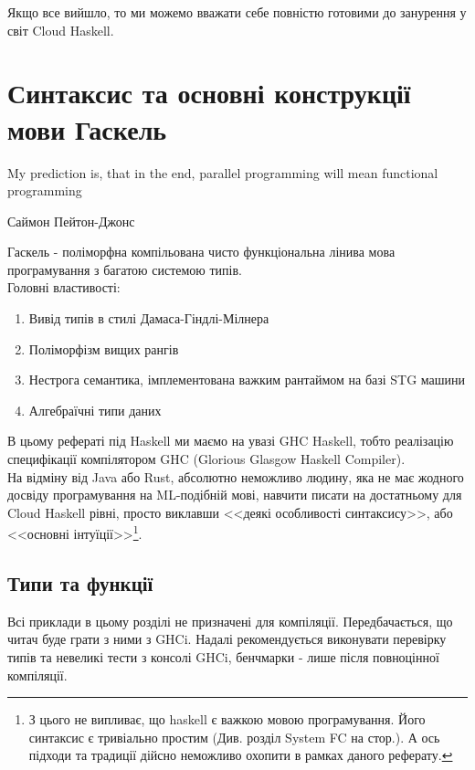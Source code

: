 \documentclass[12pt]{article}
\begin{document}
Якщо все вийшло, то ми можемо вважати себе повністю готовими до занурення у світ Cloud Haskell.\\


\section{Синтаксис та основні конструкції мови Гаскель}
\epigraph{My prediction is, that in the end, parallel programming will mean functional programming}{Саймон Пейтон-Джонс}

Гаскель - поліморфна компільована чисто функціональна лінива мова програмування з багатою системою типів.\\

Головні властивості:
\begin{enumerate}
\item Вивід типів в стилі Дамаса-Гіндлі-Мілнера
\item Поліморфізм вищих рангів
\item Нестрога семантика, імплементована важким рантаймом на базі STG машини
\item Алгебраїчні типи даних
\end{enumerate}

В цьому рефераті під Haskell ми маємо на увазі GHC Haskell, тобто реалізацію специфікації компілятором 
GHC (Glorious Glasgow Haskell Compiler).\\

На відміну від Java або Rust, абсолютно неможливо людину, яка не має жодного досвіду програмування на 
ML-подібній мові, навчити писати на достатньому для Cloud Haskell рівні, просто виклавши 
<<деякі особливості синтаксису>>, або <<основні інтуїції>>\footnote{З цього  не випливає, що haskell 
є важкою мовою програмування. Його синтаксис є тривіально простим (Див. розділ System FC на стор.\pageref{systemFC}). 
А ось підходи та традиції дійсно неможливо охопити в рамках даного реферату.}.\\


\subsection{Типи та функції}

Всі приклади в цьому розділі не призначені для компіляції. 
Передбачається, що читач буде грати з ними з GHCi. 
Надалі рекомендується виконувати перевірку типів та 
невеликі тести з консолі GHCi, бенчмарки - лише після
повноцінної компіляції.\\
\end{document}
